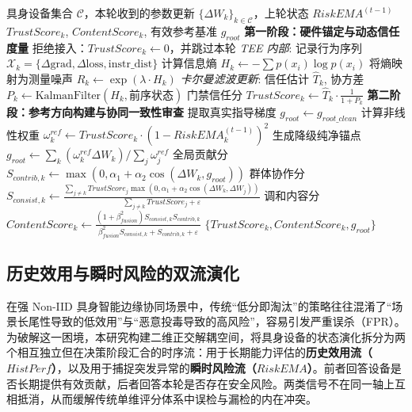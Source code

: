 \documentclass[11pt, a4paper, UTF8, fontset=fandol]{ctexart}
\begin{document}
\begin{algorithm}[htbp]
    \caption{基于 TEE 硬件锚点与纯净参考的准入与内容审查}
    \label{alg:phase12}
    \begin{algorithmic}[1]
        \REQUIRE 具身设备集合 $\mathcal{C}$，本轮收到的参数更新 $\{\Delta W_k\}_{k\in\mathcal{C}}$，上轮状态 $RiskEMA^{(t-1)}$
        \ENSURE $TrustScore_k$, $ContentScore_k$, 有效参考基准 $g_{root}$
        \STATE \textbf{第一阶段：硬件锚定与动态信任度量}
        \STATE 拒绝接入：$TrustScore_k \leftarrow 0$，并跳过本轮
        \ELSE
        \STATE \textit{TEE 内部}: 记录行为序列 $\mathcal{X}_k = \{ \Delta \text{grad}, \Delta \text{loss}, \text{instr\_dist} \}$
        \STATE 计算信息熵 $H_k \leftarrow -\sum p(x_i) \log p(x_i)$
        \STATE 将熵映射为测量噪声 $R_k \leftarrow \exp(\lambda \cdot H_k)$
        \STATE \textit{卡尔曼滤波更新}:
        \STATE 信任估计 $\hat{T}_k$, 协方差 $P_k \leftarrow \mathrm{KalmanFilter}(H_k, \text{前序状态})$
        \STATE 门禁信任分 $TrustScore_k \leftarrow \hat{T}_k \cdot \frac{1}{1 + P_k}$
        \ENDIF
        \ENDFOR
        \STATE \textbf{第二阶段：参考方向构建与协同一致性审查}
        \STATE 提取真实指导梯度 $g_{root} \leftarrow g_{root\_clean}$
        \ELSE
        \STATE 计算非线性权重 $\omega_k^{ref} \leftarrow TrustScore_k \cdot (1 - RiskEMA_k^{(t-1)})^2$
        \STATE 生成降级纯净锚点 $g_{root} \leftarrow \sum_k (\omega_k^{ref} \Delta W_k) / \sum_j \omega_j^{ref}$
        \ENDIF
        \STATE 全局贡献分 $S_{contrib,k} \leftarrow \max(0, \alpha_1 + \alpha_2 \cos(\Delta W_k, g_{root}))$
        \STATE 群体协作分 $S_{consist,k} \leftarrow \frac{\sum_{j \neq k} TrustScore_j \max(0, \alpha_1 + \alpha_2 \cos(\Delta W_k, \Delta W_j))}{\sum_{j \neq k} TrustScore_j + \varepsilon}$
        \STATE 调和内容分 $ContentScore_k \leftarrow \frac{(1+\beta_{fusion}^2)S_{consist,k} S_{contrib,k}}{\beta_{fusion}^2 S_{consist,k} + S_{contrib,k} + \varepsilon}$
        \ENDFOR
        \RETURN $\{TrustScore_k, ContentScore_k, g_{root}\}$
    \end{algorithmic}
\end{algorithm}


\subsection{历史效用与瞬时风险的双流演化}
在强 Non-IID 具身智能边缘协同场景中，传统“低分即淘汰”的策略往往混淆了“场景长尾性导致的低效用”与“恶意投毒导致的高风险”，容易引发严重误杀（FPR）。为破解这一困境，本研究构建二维正交解耦空间，将具身设备的状态演化拆分为两个相互独立但在决策阶段汇合的时序流：用于长期能力评估的\textbf{历史效用流（$HistPerf$）}，以及用于捕捉突发异常的\textbf{瞬时风险流（$RiskEMA$）}。前者回答设备是否长期提供有效贡献，后者回答本轮是否存在安全风险。两类信号不在同一轴上互相抵消，从而缓解传统单维评分体系中误检与漏检的内在冲突。
\end{document}
